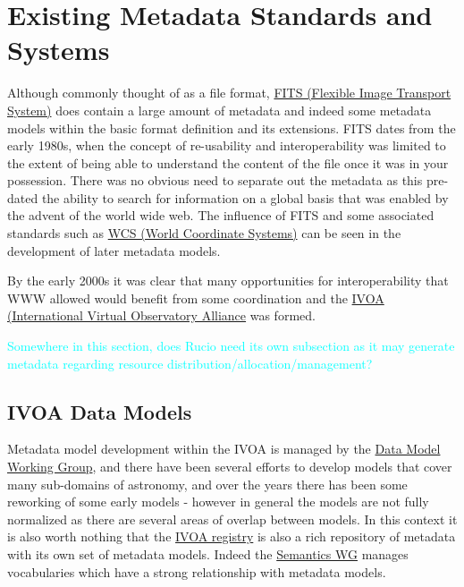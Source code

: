 \section{Existing Metadata Standards and Systems}\label{sec:exist_mod}

Although commonly thought of as a file format, \href{https://fits.gsfc.nasa.gov}{FITS (Flexible Image Transport System)} does contain a large amount of metadata and indeed some metadata models within the basic format definition and its extensions. FITS dates from the early 1980s, when the concept of re-usability and interoperability was limited to the extent of being able to understand the content of the file once it was in your possession. There was no obvious need to separate out the metadata as this pre-dated the ability to search for information on a global basis that was enabled by the advent of the world wide web. The influence of FITS and some associated standards such as \href{https://fits.gsfc.nasa.gov/fits_wcs.html}{WCS (World Coordinate Systems)} can be seen in the development of later metadata models.

By the early 2000s it was clear that many opportunities for interoperability that WWW allowed would benefit from some coordination and the \href{https://www.ivoa.net}{IVOA (International Virtual Observatory Alliance} was formed.




\textcolor{cyan}{Somewhere in this section, does Rucio need its own subsection as it may generate metadata regarding resource distribution/allocation/management?  
}


\subsection{IVOA Data Models}

Metadata model development within the IVOA is managed by the \href{https://wiki.ivoa.net/twiki/bin/view/IVOA/IvoaDataModel}{Data Model Working Group}, and there have been several efforts to develop models that cover many sub-domains of astronomy, and over the years there has been some reworking of some early models - however in general the models are not fully normalized as there are several areas of overlap between models. In this context it is also worth nothing that the \href{https://wiki.ivoa.net/twiki/bin/view/IVOA/IvoaResReg}{IVOA registry} is also a rich repository of metadata with its own set of metadata models. Indeed the \href{https://wiki.ivoa.net/twiki/bin/view/IVOA/IvoaSemantics}{Semantics WG} manages vocabularies which have  a strong relationship with metadata models.


